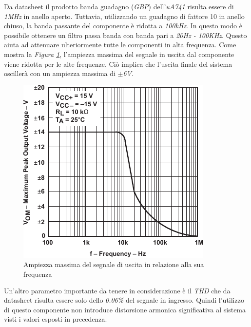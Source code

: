 \documentclass[titlepage]{report}
\begin{document}
	Da datasheet il prodotto banda guadagno (\textit{GBP}) dell'\textit{uA741} risulta essere di \textit{1MHz} in anello aperto. Tuttavia, utilizzando un guadagno di fattore 10 in anello chiuso, la banda passante del componente è ridotta a \textit{100kHz}. In questo modo è possibile ottenere un filtro passa banda con banda pari a \textit{20Hz - 100KHz}. Questo aiuta ad attenuare ulteriormente tutte le componenti in alta frequenza.
	Come mostra la \textit{Figura \ref{fig:gbp_ua741}}, l'ampiezza massima del segnale in uscita dal componente viene ridotta per le alte frequenze. Ciò implica che l'uscita finale del sistema oscillerà con un ampiezza massima di \textit{$\pm$6V}.

	\begin{figure}[H]
		\centering
		\includegraphics[scale=1]{Immagini/gbp_ua741.pdf}
		\caption{Ampiezza massima del segnale di uscita in relazione alla sua frequenza}
		\label{fig:gbp_ua741}
	\end{figure}

	Un'altro parametro importante da tenere in considerazione è il \textit{THD} che da datasheet risulta essere solo dello \textit{0.06\%} del segnale in ingresso. Quindi l'utilizzo di questo componente non introduce distorsione armonica significativa al sistema visti i valori esposti in precedenza.
	
\end{document}

